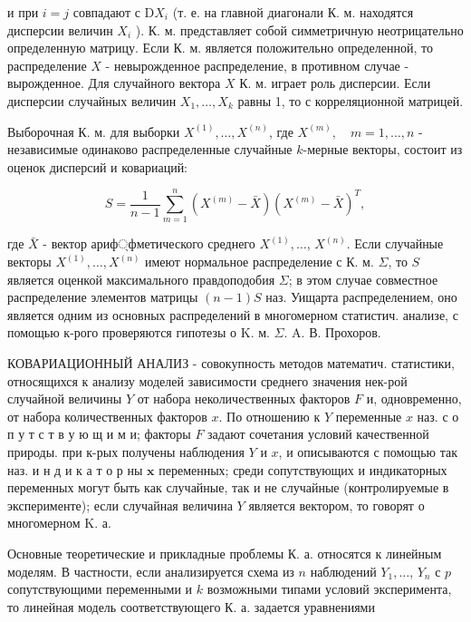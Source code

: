 \documentclass[10pt]{article}
\begin{document}
и при $i=j$ совпадают с $\mathrm{D} X_{i}$ (т. е. на главной диагонали К. м. находятся дисперсии величин $X_{i}$ ). К. м. представляет собой симметричную неотрицательно определенную матрицу. Если К. м. является положительно определенной, то распределение $X$ - невырожденное распределение, в противном случае - вырожденное. Для случайного вектора $X$ К. м. играет роль дисперсии. Если дисперсии случайных величин $X_{1}, \ldots, X_{k}$ равны 1, то с корреляционной матрицей.



Выборочная К. м. для выборки $X^{(1)}, \ldots, X^{(n)}$, где $X^{(m)}, \quad m=1, \ldots, n$ - независимые одинаково распределенные случайные $k$-мерные векторы, состоит из оценок дисперсий и ковариаций:



\[

S=\frac{1}{n-1} \sum_{m=1}^{n}\left(X^{(m)}-\bar{X}\right)\left(X^{(m)}-\bar{X}\right)^{T},

\]



где $\bar{X}$ - вектор ариф্фметического среднего $X^{(1)}, \ldots$, $X^{(n)}$. Если случайные векторы $X^{(1)}, \ldots, X^{(n)}$ имеют нормальное распределение с К. м. $\Sigma$, то $S$ является оценкой максимального правдоподобия $\Sigma$; в этом случае совместное распределение элементов матрицы $(n-1) S$ наз. Уищарта распределением, оно является одним из основных распределений в многомерном статистич. анализе, с помощью к-рого проверяются гипотезы о K. м. $\Sigma$. A. В. Прохоров.



КОВАРИАЦИОННЫЙ АНАЛИЗ - совокупность методов математич. статистики, относящихся к анализу моделей зависимости среднего значения нек-рой случайной величины $Y$ от набора неколичественных факторов $F$ и, одновременно, от набора количественных факторов $x$. По отношению к $Y$ переменные $x$ наз. с о п у т с т в у ю щ и м и; факторы $F$ задают сочетания условий качественной природы. при к-рых получены наблюдения $Y$ и $x$, и описываются с помощью так наз. и н д и к а т о р ны $\mathbf{x}$ переменных; среди сопутствующих и индикаторных переменных могут быть как случайные, так и не случайные (контролируемые в эксперименте); если случайная величина $Y$ является вектором, то говорят о многомерном $\mathrm{K}$. а.



Основные теоретические и прикладные проблемы К. а. относятся к линейным моделям. В частности, если анализируется схема из $n$ наблюдений $Y_{1}, \ldots$, $Y_{n}$ с $p$ сопутствующими переменными и $k$ возможными типами условий эксперимента, то линейная модель соответствующего К. а. задается уравнениями
\end{document}
